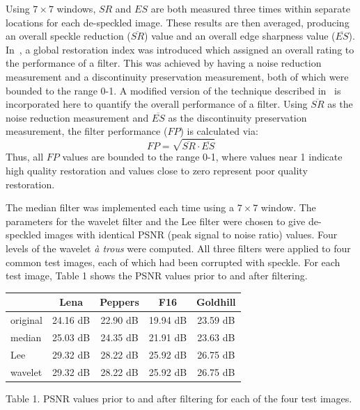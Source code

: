 \documentclass[twocolumn]{article}
\begin{document}
Using $7\times7$ windows, $SR$ and $ES$ are both measured three times within separate locations for each de-speckled image.
These results are then averaged, producing an overall speckle reduction ($\overline{SR}$) value and an overall edge 
sharpness value ($\overline{ES}$).
In~\cite{jimenez01}, a global restoration index was introduced which assigned an overall rating to the
performance of a filter. This was achieved by having a noise reduction measurement and a discontinuity preservation 
measurement, both of which were bounded to the range 0-1. 
A modified version of the technique described in~\cite{jimenez01} is incorporated here to quantify the overall performance of a filter. 
Using $\overline{SR}$ as the noise reduction measurement and $\overline{ES}$ as the discontinuity preservation measurement, 
the filter performance ($FP$) is calculated via: 
\begin{equation}
\label{eq:fp}
	FP= \sqrt { \overline{SR} \cdot \overline{ES}}
\end{equation}
Thus, all $FP$ values are bounded to the range 0-1, where values near 1 indicate high quality restoration 
and values close to zero represent poor quality restoration.

The median filter was implemented each time using a $7\times7$ window.
The parameters for the wavelet filter and the Lee filter were chosen to give
de-speckled images with identical PSNR (peak signal to noise ratio) values.
Four levels of the wavelet \emph{\`a trous} were computed.
All three filters were applied to four common test images, each of which had been corrupted with speckle. 
For each test image, Table 1 shows the PSNR values prior to and after filtering.

\begin{table}[ht]
\begin{center}
\begin{footnotesize}
\begin{tabular}{|l|c|c|c|c|} \hline
 		& Lena		& Peppers	& F16 		& Goldhill 	\\ \hline
original	& 24.16 dB	& 22.90 dB	& 19.94 dB	& 23.59 dB	\\ \hline
median		& 25.03 dB	& 24.35 dB	& 21.91 dB	& 23.63 dB	\\ \hline
Lee		& 29.32 dB	& 28.22 dB	& 25.92 dB	& 26.75 dB	\\ \hline
wavelet		& 29.32 dB	& 28.22 dB	& 25.92 dB	& 26.75 dB	\\ \hline
\end{tabular}
\end{footnotesize}
\end{center}
\begin{minipage}[h]{8.3cm}
	{\begin{center} Table 1. PSNR values prior to and after filtering for each of the four test images. \end{center}}
\end{minipage}
\end{table}
\end{document}
